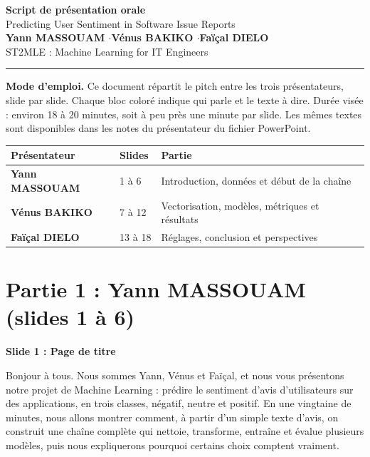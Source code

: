 \documentclass[11pt,a4paper]{article}
\newenvironment{turn}[2]%
{\begin{mdframed}[linewidth=0pt,backgroundcolor=panel,skipabove=6pt,skipbelow=6pt,
   innerleftmargin=10pt,innerrightmargin=10pt,innertopmargin=7pt,innerbottommargin=7pt,
   leftline=true,linecolor=#1,linewidth=3pt]%
 {\color{#1}\bfseries #2}\par\vspace{2pt}}
{\end{mdframed}}
\begin{document}
\begin{center}
{\color{primary}\LARGE\bfseries Script de présentation orale}\\[4pt]
{\large Predicting User Sentiment in Software Issue Reports}\\[10pt]
{\large\bfseries Yann MASSOUAM \quad$\cdot$\quad Vénus BAKIKO \quad$\cdot$\quad Faïçal DIELO}\\[4pt]
{ST2MLE : Machine Learning for IT Engineers}
\end{center}

\vspace{0.4cm}
{\color{accent}\rule{\linewidth}{1.2pt}}

\textbf{Mode d'emploi.} Ce document répartit le pitch entre les trois présentateurs,
slide par slide. Chaque bloc coloré indique qui parle et le texte à dire. Durée visée :
environ 18 à 20 minutes, soit à peu près une minute par slide. Les mêmes textes sont
disponibles dans les notes du présentateur du fichier PowerPoint.

\begin{table}[h]
\centering
\begin{tabular}{lll}
\toprule
\textbf{Présentateur} & \textbf{Slides} & \textbf{Partie} \\
\midrule
\textcolor{yann}{\textbf{Yann MASSOUAM}}  & 1 à 6   & Introduction, données et début de la chaîne \\
\textcolor{venus}{\textbf{Vénus BAKIKO}}  & 7 à 12  & Vectorisation, modèles, métriques et résultats \\
\textcolor{faical}{\textbf{Faïçal DIELO}} & 13 à 18 & Réglages, conclusion et perspectives \\
\bottomrule
\end{tabular}
\end{table}

\section*{\textcolor{yann}{Partie 1 : Yann MASSOUAM (slides 1 à 6)}}

\begin{turn}{yann}{Slide 1 : Page de titre}
Bonjour à tous. Nous sommes Yann, Vénus et Faïçal, et nous vous présentons notre projet
de Machine Learning : prédire le sentiment d'avis d'utilisateurs sur des applications,
en trois classes, négatif, neutre et positif. En une vingtaine de minutes, nous allons
montrer comment, à partir d'un simple texte d'avis, on construit une chaîne complète qui
nettoie, transforme, entraîne et évalue plusieurs modèles, puis nous expliquerons
pourquoi certains choix comptent vraiment.
\end{turn}
\end{document}
